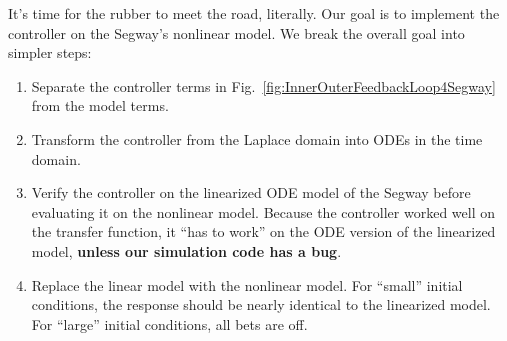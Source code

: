 It's time for the rubber to meet the road, literally. Our goal is to implement the controller on the Segway's nonlinear model. We break the overall goal into simpler steps:
\begin{enumerate}
\renewcommand{\labelenumi}{(\alph{enumi})}
\setlength{\itemsep}{.2cm}
    \item Separate the controller terms in Fig.~\ref{fig:InnerOuterFeedbackLoop4Segway} from the model terms.
    \item Transform the controller from the Laplace domain into ODEs in the time domain.
    \item Verify the controller on the linearized ODE model of the Segway before evaluating it on the nonlinear model. Because the controller worked well on the transfer function, it ``has to work'' on the ODE version of the linearized model, \textbf{unless our simulation code has a bug}. 
    \item Replace the linear model with the nonlinear model. For ``small'' initial conditions, the response should be nearly identical to the linearized model. For ``large'' initial conditions, all bets are off.
\end{enumerate}

